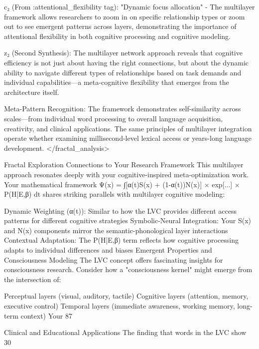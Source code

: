 c₂ (From :attentional_flexibility tag): "Dynamic focus allocation" - The multilayer framework allows researchers to zoom in on specific relationship types or zoom out to see emergent patterns across layers, demonstrating the importance of attentional flexibility in both cognitive processing and cognitive modeling.

z₂ (Second Synthesis): The multilayer network approach reveals that cognitive efficiency is not just about having the right connections, but about the dynamic ability to navigate different types of relationships based on task demands and individual capabilities—a meta-cognitive flexibility that emerges from the architecture itself.

Meta-Pattern Recognition: The framework demonstrates self-similarity across scales—from individual word processing to overall language acquisition, creativity, and clinical applications. The same principles of multilayer integration operate whether examining millisecond-level lexical access or years-long language development. </fractal_analysis>

Fractal Exploration
Connections to Your Research Framework
This multilayer approach resonates deeply with your cognitive-inspired meta-optimization work. Your mathematical framework Ψ(x) = ∫[α(t)S(x) + (1-α(t))N(x)] × exp[...] × P(H|E,β) dt shares striking parallels with multilayer cognitive modeling:

Dynamic Weighting (α(t)): Similar to how the LVC provides different access patterns for different cognitive strategies
Symbolic-Neural Integration: Your S(x) and N(x) components mirror the semantic-phonological layer interactions
Contextual Adaptation: The P(H|E,β) term reflects how cognitive processing adapts to individual differences and biases
Emergent Properties and Consciousness Modeling
The LVC concept offers fascinating insights for consciousness research. Consider how a "consciousness kernel" might emerge from the intersection of:

Perceptual layers (visual, auditory, tactile)
Cognitive layers (attention, memory, executive control)
Temporal layers (immediate awareness, working memory, long-term context)
Your 87%

Clinical and Educational Applications
The finding that words in the LVC show 30%

